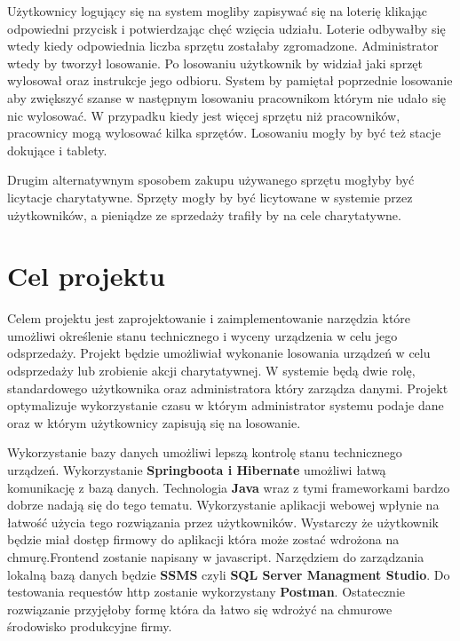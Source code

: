 Użytkownicy logujący się na system mogliby zapisywać się na loterię klikając odpowiedni przycisk i potwierdzając chęć wzięcia udziału. Loterie odbywałby się wtedy kiedy odpowiednia liczba sprzętu zostałaby zgromadzone. Administrator wtedy by tworzył losowanie. Po losowaniu użytkownik by widział jaki sprzęt wylosował oraz instrukcje jego odbioru. System by pamiętał poprzednie losowanie aby zwiększyć szanse w następnym losowaniu pracownikom którym nie udało się nic wylosować. W przypadku kiedy jest więcej sprzętu niż pracowników, pracownicy mogą wylosować kilka sprzętów. Losowaniu mogły by być też stacje dokujące i tablety.

Drugim alternatywnym sposobem zakupu używanego sprzętu mogłyby być licytacje charytatywne. Sprzęty mogły by być licytowane w systemie przez użytkowników, a pieniądze ze sprzedaży trafiły by na cele charytatywne.
   
\section{Cel projektu}

Celem projektu jest zaprojektowanie i zaimplementowanie narzędzia które umożliwi określenie stanu technicznego i wyceny urządzenia w celu jego odsprzedaży. Projekt będzie umożliwiał wykonanie losowania urządzeń w celu odsprzedaży lub zrobienie akcji charytatywnej. W systemie będą dwie rolę, standardowego użytkownika oraz administratora który zarządza danymi. Projekt optymalizuje wykorzystanie czasu w którym administrator systemu podaje dane oraz w którym użytkownicy zapisują się na losowanie.

 Wykorzystanie bazy danych umożliwi lepszą kontrolę stanu technicznego urządzeń. Wykorzystanie \textbf{Springboota i Hibernate }umożliwi łatwą komunikację z bazą danych. Technologia \textbf{Java }wraz z tymi frameworkami bardzo dobrze nadają się do tego tematu. Wykorzystanie aplikacji webowej wpłynie na łatwość użycia tego rozwiązania przez użytkowników. Wystarczy że użytkownik będzie miał dostęp firmowy do aplikacji która może zostać wdrożona na chmurę.Frontend zostanie napisany w javascript. Narzędziem do zarządzania lokalną bazą danych będzie \textbf{SSMS }czyli \textbf{SQL Server Managment Studio}. Do testowania requestów http zostanie wykorzystany \textbf{Postman}. Ostatecznie rozwiązanie przyjęłoby formę która da łatwo się wdrożyć na chmurowe środowisko produkcyjne firmy.